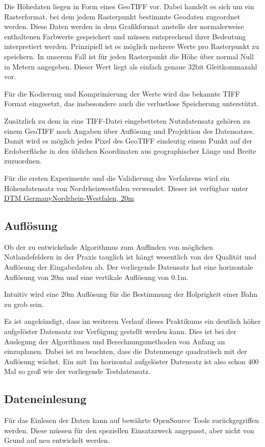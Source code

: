 \documentclass[
11pt, %
a4paper, %
oneside, %
pdfspacing, %
headinclude,
BCOR5mm, %
ngerman, %
bibtotocnumbered,
]{scrartcl}
\begin{document}
Die Höhedaten liegen in Form eines GeoTIFF vor. Dabei handelt es sich um ein Rasterformat, bei dem jedem Rasterpunkt bestimmte Geodaten zugeordnet werden. Diese Daten werden in dem Grafikformat anstelle der normalerweise enthaltenen Farbwerte gespeichert und müssen entsprechend ihrer Bedeutung interpretiert werden. Prinzipiell ist es möglich mehrere Werte pro Rasterpunkt zu speichern. In unserem Fall ist für jeden Rasterpunkt die Höhe über normal Null in Metern angegeben. Dieser Wert liegt als einfach genaue 32bit Gleitkommazahl vor.

Für die Kodierung und Komprimierung der Werte wird das bekannte TIFF Format eingesetzt, das insbesondere auch die verlustlose Speicherung unterstützt.

Zusätzlich zu dem in eine TIFF-Datei eingebetteten Nutzdatensatz gehören zu einem GeoTIFF noch Angaben über Auflösung und Projektion des Datensatzes. Damit wird es möglich jedes Pixel des GeoTIFF eindeutig einem Punkt auf der Erdoberfläche in den üblichen Koordinaten aus geographischer Länge und Breite zuzuordnen.

Für die ersten Experimente und die Validierung des Verfahrens wird ein Höhendatensatz von Nordrheinwestfalen verwendet. Dieser ist verfügbar unter \href{http://data.opendataportal.at/dataset/dtm-germany/resource/08d8c183-a4cc-4a7b-84a0-d03f92076ed3}{DTM Germany\textunderscore Nordrhein-Westfalen, 20m}


	\subsection{Auflösung}
	Ob der zu entwickelnde Algorithmus zum Auffinden von möglichen Notlandefeldern in der Praxis tauglich ist hängt wesentlich von der Qualität und Auflösung der Eingabedaten ab. Der vorliegende Datensatz hat eine horizontale Auflösung von 20m und eine vertikale Auflösung von 0.1m. 
	
	Intuitiv wird eine 20m Auflösung für die Bestimmung der Holprigkeit einer Bahn zu grob sein. 
	
	Es ist angekündigt, dass im weiteren Verlauf dieses Praktikums ein deutlich höher aufgelöster Datensatz zur Verfügung gestellt werden kann. Dies ist bei der Auslegung der Algorithmen und Berechnungsmethoden von Anfang an einzuplanen. Dabei ist zu beachten, dass die Datenmenge quadratisch mit der Auflösung wächst. Ein mit 1m horizontal aufgelöster Datensatz ist also schon 400 Mal so groß wie der vorliegende Testdatensatz.
	
	\subsection{Dateneinlesung}
	Für das Einlesen der Daten kann auf bewährte OpenSource Tools zurückgegriffen werden. Diese müssen für den speziellen Einsatzzweck angepasst, aber nicht von Grund auf neu entwickelt werden.
	
\end{document}
